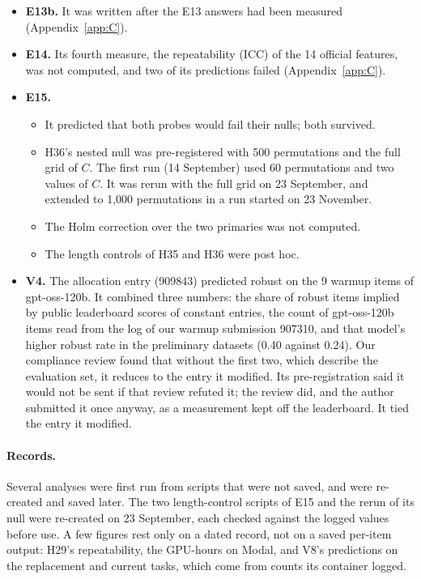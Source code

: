 \begin{itemize}
\begin{itemize}
  \item The subsampling curve varied the variants per problem, where the design varied them per family.
  \item The token cap was raised from 8,192 to 16,384 before execution.
  \end{itemize}
\item \textbf{E13b.} It was written after the E13 answers had been measured (Appendix~\ref{app:C}).
\item \textbf{E14.} Its fourth measure, the repeatability (ICC) of the 14 official features, was not computed, and two of its predictions failed (Appendix~\ref{app:C}).
\item \textbf{E15.}
  \begin{itemize}
  \item It predicted that both probes would fail their nulls; both survived.
  \item H36's nested null was pre-registered with 500 permutations and the full grid of $C$. The first run (14 September) used 60 permutations and two values of $C$. It was rerun with the full grid on 23 September, and extended to 1{,}000 permutations in a run started on 23 November.
  \item The Holm correction over the two primaries was not computed.
  \item The length controls of H35 and H36 were post hoc.
  \end{itemize}
\item \textbf{V4.} The allocation entry (909843) predicted robust on the 9 warmup items of gpt-oss-120b. It combined three numbers: the share of robust items implied by public leaderboard scores of constant entries, the count of gpt-oss-120b items read from the log of our warmup submission 907310, and that model's higher robust rate in the preliminary datasets (0.40 against 0.24). Our compliance review found that without the first two, which describe the evaluation set, it reduces to the entry it modified. Its pre-registration said it would not be sent if that review refuted it; the review did, and the author submitted it once anyway, as a measurement kept off the leaderboard. It tied the entry it modified.
\end{itemize}

\paragraph{Records.} Several analyses were first run from scripts that were not saved, and were re-created and saved later. The two length-control scripts of E15 and the rerun of its null were re-created on 23 September, each checked against the logged values before use. A few figures rest only on a dated record, not on a saved per-item output: H29's repeatability, the GPU-hours on Modal, and V8's predictions on the replacement and current tasks, which come from counts its container logged.


